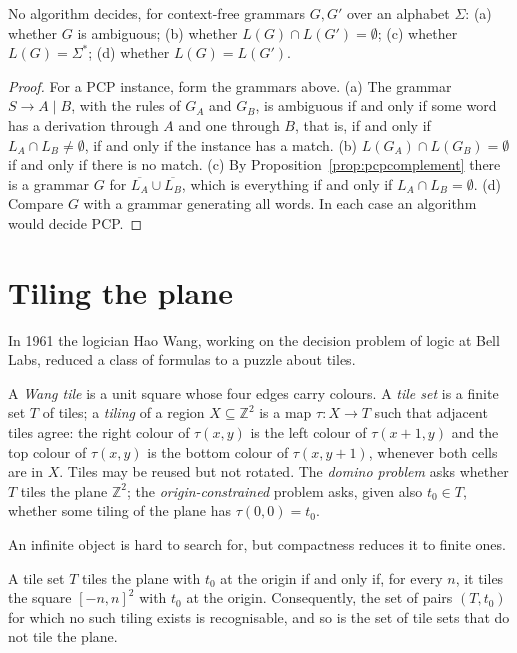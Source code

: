 \begin{corollary}\label{cor:cfgundecidable}
No algorithm decides, for context-free grammars $G,G'$ over an alphabet $\Sigma$:
\textup{(a)} whether $G$ is ambiguous; \textup{(b)} whether $L(G)\cap L(G')=\emptyset$; \textup{(c)} whether $L(G)=\Sigma^*$; \textup{(d)} whether $L(G)=L(G')$.
\end{corollary}

\begin{proof}
For a PCP instance, form the grammars above. (a) The grammar $S\to A\mid B$, with the rules of $G_A$ and $G_B$, is ambiguous if and only if some word has a derivation through $A$ and one through $B$, that is, if and only if $L_A\cap L_B\ne\emptyset$, if and only if the instance has a match. (b) $L(G_A)\cap L(G_B)=\emptyset$ if and only if there is no match. (c) By Proposition~\ref{prop:pcpcomplement} there is a grammar $G$ for $\overline{L_A}\cup\overline{L_B}$, which is everything if and only if $L_A\cap L_B=\emptyset$. (d) Compare $G$ with a grammar generating all words. In each case an algorithm would decide PCP.
\end{proof}

\section{Tiling the plane}\label{sec:wang}

In 1961 the logician Hao Wang, working on the decision problem of logic at Bell Labs, reduced a class of formulas to a puzzle about tiles.

\begin{definition}\label{def:wang}
A \emph{Wang tile} is a unit square whose four edges carry colours. A \emph{tile set} is a finite set $T$ of tiles; a \emph{tiling} of a region $X\subseteq\mathbb Z^2$ is a map $\tau:X\to T$ such that adjacent tiles agree: the right colour of $\tau(x,y)$ is the left colour of $\tau(x+1,y)$ and the top colour of $\tau(x,y)$ is the bottom colour of $\tau(x,y+1)$, whenever both cells are in $X$. Tiles may be reused but not rotated. The \emph{domino problem} asks whether $T$ tiles the plane $\mathbb Z^2$; the \emph{origin-constrained} problem asks, given also $t_0\in T$, whether some tiling of the plane has $\tau(0,0)=t_0$.
\end{definition}

An infinite object is hard to search for, but compactness reduces it to finite ones.

\begin{proposition}\label{prop:compactness}
A tile set $T$ tiles the plane with $t_0$ at the origin if and only if, for every $n$, it tiles the square $[-n,n]^2$ with $t_0$ at the origin. Consequently, the set of pairs $(T,t_0)$ for which no such tiling exists is recognisable, and so is the set of tile sets that do not tile the plane.
\end{proposition}

